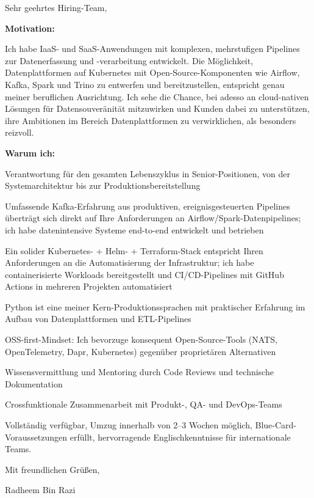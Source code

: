 \documentclass[11pt,a4paper]{coverletter}
\begin{document}
\clearpage
{}


\opening{Sehr geehrtes Hiring-Team,}

\textbf{Motivation:}

Ich habe IaaS- und SaaS-Anwendungen mit komplexen, mehrstufigen Pipelines zur Datenerfassung und -verarbeitung entwickelt. Die Möglichkeit, Datenplattformen auf Kubernetes mit Open-Source-Komponenten wie Airflow, Kafka, Spark und Trino zu entwerfen und bereitzustellen, entspricht genau meiner beruflichen Ausrichtung. Ich sehe die Chance, bei adesso an cloud-nativen Lösungen für Datensouveränität mitzuwirken und Kunden dabei zu unterstützen, ihre Ambitionen im Bereich Datenplattformen zu verwirklichen, als besonders reizvoll.

\textbf{Warum ich:}

\bullets

  \item Verantwortung für den gesamten Lebenszyklus in Senior-Positionen, von der Systemarchitektur bis zur Produktionsbereitstellung

  \item Umfassende Kafka-Erfahrung aus produktiven, ereignisgesteuerten Pipelines überträgt sich direkt auf Ihre Anforderungen an Airflow/Spark-Datenpipelines; ich habe datenintensive Systeme end-to-end entwickelt und betrieben

  \item Ein solider Kubernetes- + Helm- + Terraform-Stack entspricht Ihren Anforderungen an die Automatisierung der Infrastruktur; ich habe containerisierte Workloads bereitgestellt und CI/CD-Pipelines mit GitHub Actions in mehreren Projekten automatisiert

  \item Python ist eine meiner Kern-Produktionssprachen mit praktischer Erfahrung im Aufbau von Datenplattformen und ETL-Pipelines

  \item OSS-first-Mindset: Ich bevorzuge konsequent Open-Source-Tools (NATS, OpenTelemetry, Dapr, Kubernetes) gegenüber proprietären Alternativen

  \item Wissensvermittlung und Mentoring durch Code Reviews und technische Dokumentation

  \item Crossfunktionale Zusammenarbeit mit Produkt-, QA- und DevOps-Teams

\bulletsend

Vollständig verfügbar, Umzug innerhalb von 2–3 Wochen möglich, Blue-Card-Voraussetzungen erfüllt, hervorragende Englischkenntnisse für internationale Teams.

\closing{Mit freundlichen Grüßen,}{Radheem Bin Razi}
\end{document}
